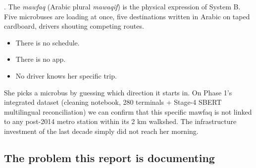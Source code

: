 . The \emph{mawfaq} (Arabic plural \emph{mawaqif})
is the physical expression of System B. Five microbuses are loading at
once, five destinations written in Arabic on taped cardboard, drivers
shouting competing routes.

\begin{itemize}
  \item There is no schedule.
  \item There is no app.
  \item No driver knows her specific trip.
\end{itemize}

She picks a microbus by guessing which direction it starts in. On Phase
1's integrated dataset (cleaning notebook, 280 terminals + Stage-4
SBERT multilingual reconciliation) we can confirm that this specific
mawfaq is not linked to any post-2014 metro station within its 2 km
walkshed. The infrastructure investment of the last decade simply did
not reach her morning.

\subsection{The problem this report is documenting}


